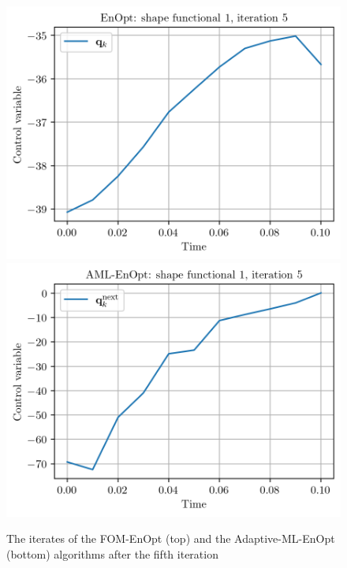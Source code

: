 \begin{figure}
\centering
\includegraphics{Plots/FOMEnOptIter5.png}
\includegraphics{Plots/ROMEnOptIter5.png}
\caption{\label{FOMROMEnIptIter5}The iterates of the FOM-EnOpt (top) and the Adaptive-ML-EnOpt (bottom) algorithms after the fifth iteration}
\end{figure}

